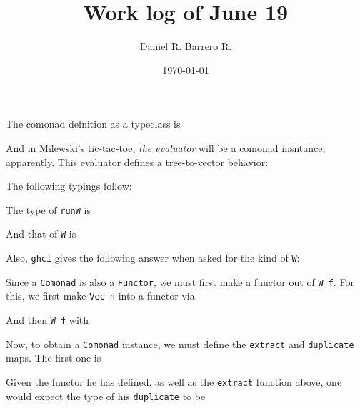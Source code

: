 \documentclass{amsart}
\title{Work log of June 19}
\author{Daniel R. Barrero R.}
\date{\today}
\begin{document}
\maketitle

\section{}

The comonad defnition as a typeclass is



And in Milewski's tic-tac-toe, \emph{the evaluator} will be a comonad insntance,
apparently. This evaluator defines a tree-to-vector behavior:



The following typings follow:

\bigskip

The type of \texttt{runW} is



And that of \texttt{W} is



Also, \texttt{ghci} gives the following answer when asked for the kind of
\texttt{W}:



Since a \texttt{Comonad} is also a \texttt{Functor}, we must first make a
functor out of \texttt{W f}. For this, we first make \texttt{Vec n} into a
functor via



And then \texttt{W f} with



Now, to obtain a \texttt{Comonad} instance, we must define the \texttt{extract}
and \texttt{duplicate} maps. The first one is



Given the functor he has defined, as well as the \texttt{extract} function
above, one would expect the type of his \texttt{duplicate} to be


\end{document}
